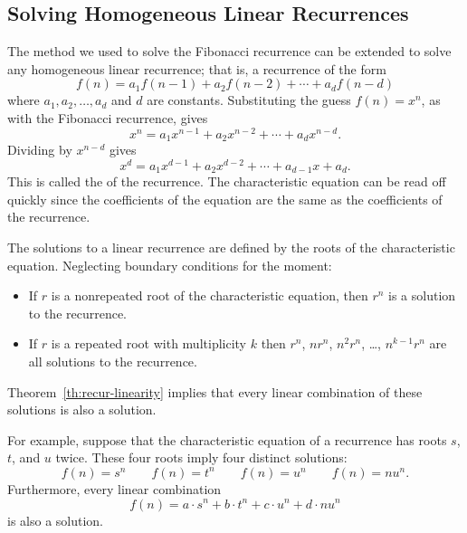 \subsection{Solving Homogeneous Linear Recurrences}

The method we used to solve the Fibonacci recurrence can be extended
to solve any homogeneous linear recurrence; that is, a recurrence of
the form
\[
f(n) = a_1 f(n-1) + a_2 f(n-2) + \cdots + a_d f(n - d)
\]
where $a_1, a_2, \dots, a_d$ and $d$ are constants.  Substituting the
guess $f(n) = x^n$, as with the Fibonacci recurrence, gives
\[
   x^n = a_1x^{n-1} +a_2x^{n-2} + \cdots +a_dx^{n-d}.
\]
Dividing by $x^{n-d}$ gives
\[
x^d = a_1x^{d-1} + a_2x^{d-2} + \cdots+a_{d-1}x+a_d.
\]
This is called the  of the
recurrence.  The characteristic equation can be read off quickly
since the coefficients of the equation are the same as the
coefficients of the recurrence.

The solutions to a linear recurrence are defined by the roots of the
characteristic equation.  Neglecting boundary conditions for the
moment:
\begin{itemize}
\item If $r$ is a nonrepeated root of the characteristic equation,
  then $r^n$ is a solution to the recurrence.
\item If $r$ is a repeated root with multiplicity $k$ then $r^n$,
  $nr^n$, $n^2r^n$, \dots, $n^{k-1}r^n$ are all solutions to the
  recurrence.
\end{itemize}
Theorem~\ref{th:recur-linearity} implies that every linear
  combination of these solutions is also a solution.

For example, suppose that the characteristic equation of a
recurrence has roots $s$, $t$, and $u$ twice.  These four roots
imply four distinct solutions:
\[
f(n) = s^n \qquad f(n) = t^n \qquad f(n) = u^n \qquad f(n)
  = nu^n.
\]
Furthermore, every linear combination
\begin{equation}
f(n) = a \cdot s^n + b \cdot t^n + c \cdot u^n +d \cdot nu^n
\end{equation}
is also a solution.

